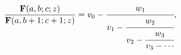 \[\frac{\mathop{\mathbf{F}\/}\nolimits\!\left(a,b;c;z\right)}{\mathop{\mathbf{F}%
\/}\nolimits\!\left(a,b+1;c+1;z\right)}=v_{0}-\cfrac{w_{1}}{v_{1}-\cfrac{w_{2}%
}{v_{2}-\cfrac{w_{3}}{v_{3}-\cdots}}},\]